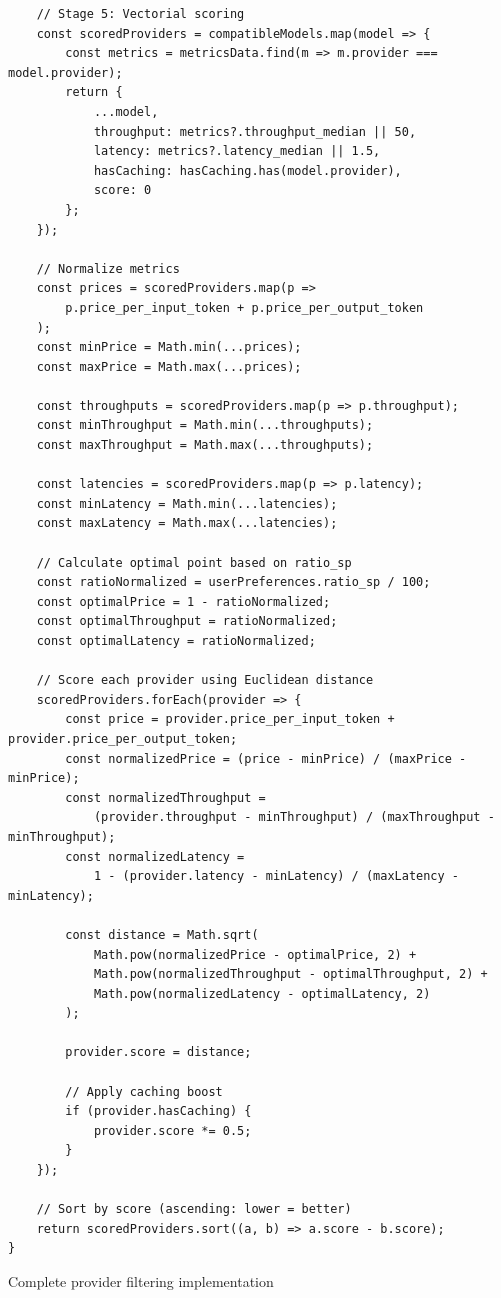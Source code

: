 \documentclass[english]{article}
\begin{document}
\begin{listing}[H]
\begin{verbatim}
    // Stage 5: Vectorial scoring
    const scoredProviders = compatibleModels.map(model => {
        const metrics = metricsData.find(m => m.provider === model.provider);
        return {
            ...model,
            throughput: metrics?.throughput_median || 50,
            latency: metrics?.latency_median || 1.5,
            hasCaching: hasCaching.has(model.provider),
            score: 0
        };
    });

    // Normalize metrics
    const prices = scoredProviders.map(p =>
        p.price_per_input_token + p.price_per_output_token
    );
    const minPrice = Math.min(...prices);
    const maxPrice = Math.max(...prices);

    const throughputs = scoredProviders.map(p => p.throughput);
    const minThroughput = Math.min(...throughputs);
    const maxThroughput = Math.max(...throughputs);

    const latencies = scoredProviders.map(p => p.latency);
    const minLatency = Math.min(...latencies);
    const maxLatency = Math.max(...latencies);

    // Calculate optimal point based on ratio_sp
    const ratioNormalized = userPreferences.ratio_sp / 100;
    const optimalPrice = 1 - ratioNormalized;
    const optimalThroughput = ratioNormalized;
    const optimalLatency = ratioNormalized;

    // Score each provider using Euclidean distance
    scoredProviders.forEach(provider => {
        const price = provider.price_per_input_token + provider.price_per_output_token;
        const normalizedPrice = (price - minPrice) / (maxPrice - minPrice);
        const normalizedThroughput =
            (provider.throughput - minThroughput) / (maxThroughput - minThroughput);
        const normalizedLatency =
            1 - (provider.latency - minLatency) / (maxLatency - minLatency);

        const distance = Math.sqrt(
            Math.pow(normalizedPrice - optimalPrice, 2) +
            Math.pow(normalizedThroughput - optimalThroughput, 2) +
            Math.pow(normalizedLatency - optimalLatency, 2)
        );

        provider.score = distance;

        // Apply caching boost
        if (provider.hasCaching) {
            provider.score *= 0.5;
        }
    });

    // Sort by score (ascending: lower = better)
    return scoredProviders.sort((a, b) => a.score - b.score);
}
\end{verbatim}
\caption{Complete provider filtering implementation}
\end{listing}
\end{document}
